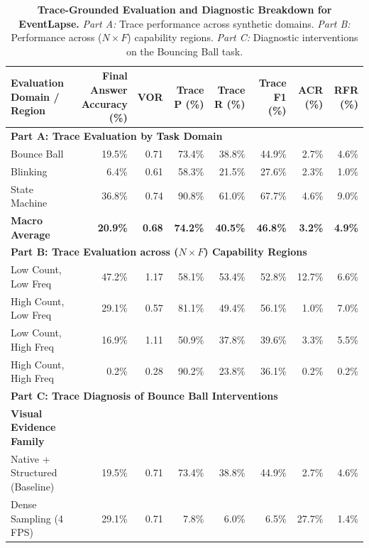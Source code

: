 \begin{table}[t]
\centering
\small
\caption{\textbf{Trace-Grounded Evaluation and Diagnostic Breakdown for EventLapse.} \emph{Part A:} Trace performance across synthetic domains. \emph{Part B:} Performance across ($N \times F$) capability regions. \emph{Part C:} Diagnostic interventions on the Bouncing Ball task.}
\label{tab:trace_grounded_evaluation}
\begin{tabular}{lrrrrrrr}
\toprule
\textbf{Evaluation Domain / Region} & \textbf{Final Answer Accuracy (\%)} & \textbf{VOR} & \textbf{Trace P (\%)} & \textbf{Trace R (\%)} & \textbf{Trace F1 (\%)} & \textbf{ACR (\%)} & \textbf{RFR (\%)} \\
\midrule
\multicolumn{8}{l}{\textbf{Part A: Trace Evaluation by Task Domain}} \\
  Bounce Ball              &  19.5\% & 0.71 &  73.4\% &  38.8\% &  44.9\% &  2.7\% &  4.6\% \\
  Blinking                 &   6.4\% & 0.61 &  58.3\% &  21.5\% &  27.6\% &  2.3\% &  1.0\% \\
  State Machine            &  36.8\% & 0.74 &  90.8\% &  61.0\% &  67.7\% &  4.6\% &  9.0\% \\
  \textbf{Macro Average}        & \textbf{ 20.9\%} & \textbf{0.68} & \textbf{ 74.2\%} & \textbf{ 40.5\%} & \textbf{ 46.8\%} & \textbf{ 3.2\%} & \textbf{ 4.9\%} \\
\midrule
\multicolumn{8}{l}{\textbf{Part B: Trace Evaluation across ($N \times F$) Capability Regions}} \\
  Low Count, Low Freq      &  47.2\% & 1.17 &  58.1\% &  53.4\% &  52.8\% & 12.7\% &  6.6\% \\
  High Count, Low Freq     &  29.1\% & 0.57 &  81.1\% &  49.4\% &  56.1\% &  1.0\% &  7.0\% \\
  Low Count, High Freq     &  16.9\% & 1.11 &  50.9\% &  37.8\% &  39.6\% &  3.3\% &  5.5\% \\
  High Count, High Freq    &   0.2\% & 0.28 &  90.2\% &  23.8\% &  36.1\% &  0.2\% &  0.2\% \\
\midrule
\multicolumn{8}{l}{\textbf{Part C: Trace Diagnosis of Bounce Ball Interventions}} \\
\textbf{Visual Evidence Family} & & & & & & & \\
  Native + Structured (Baseline)   &  19.5\% & 0.71 &  73.4\% &  38.8\% &  44.9\% &  2.7\% &  4.6\% \\
  Dense Sampling (4 FPS)           &  29.1\% & 0.71 &   7.8\% &   6.0\% &   6.5\% & 27.7\% &  1.4\% \\

\end{tabular}
\end{table}
